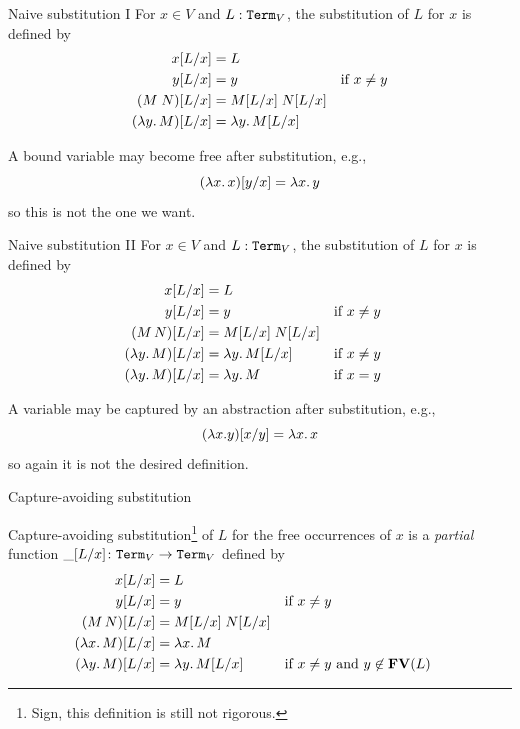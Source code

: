 \begin{frame}{Naive substitution I}
    For $x \in V$ and $L : \mathtt{Term}_V$, the substitution of $L$ for $x$ is
    defined by
    \begin{align*}
      x[{L}/{x}] & = L \\
      y[{L}/{x}] & = y & \text{if $x \neq y$} \\
      (M\;N)[{L}/{x}]& = M[{L}/{x}] \; N[{L}/{x}] \\
      (\lambda y.\, M)[{L}/{x}] & = \lambda y.\, M [{L}/{x}]
    \end{align*}

    A bound variable may become free after substitution, e.g.,\  
    \[
      (\lambda x.\, x)[{y}/{x}] = \lambda x.\, y
    \]
    so this is not the one we want.
\end{frame}
\begin{frame}{Naive substitution II}
    For $x \in V$ and $L : \mathtt{Term}_V$, the substitution
    of $L$ for $x$ is defined by
    \begin{align*}
      x[{L}/{x}] & = L \\
      y[{L}/{x}] & = y && \text{if $x \neq y$} \\
      (M\,N)[{L}/{x}] & = M[{L}/{x}]\; N[{L}/{x}] \\
      (\lambda y.\, M)[{L}/{x}] & = \lambda y.\, M[{L}/{x}] && \text{if $x \neq y$} \\
      (\lambda y.\, M)[{L}/{x}] & = \lambda y.\, M && \text{if $x = y$} 
    \end{align*}

    A variable may be captured by an abstraction after substitution, e.g.,
    \[
      (\lambda x. y)[{x}/{y}] = \lambda x.\, x
    \]
    so again it is not the desired definition.
\end{frame}


\begin{frame}{Capture-avoiding substitution}
  \begin{definition}
    Capture-avoiding substitution\footnote{Sign, this definition is still not rigorous.} of $L$ for the \alert{free occurrences} of $x$ is a
    \emph{partial} function $\_[{L}/{x}]\colon \mathtt{Term}_V \to \mathtt{Term}_V$ defined by
    \begin{align*}
      x[{L}/{x}] & = L \\
      y[{L}/{x}] & = y && \text{if $x \neq y$} \\
      (M\, N)[{L}/{x}] & = M[{L}/{x}]\; N[{L}/{x}] \\
      (\lambda x.\, M)[{L}/{x}] & = \lambda x.\, M \\
      (\lambda y.\, M)[{L}/{x}] & = \lambda y.\, M[{L}/{x}]                                 &&\text{if $x \neq y$ and $y \not\in \mathbf{FV}(L)$}
    \end{align*}
  \end{definition}

\end{frame}

